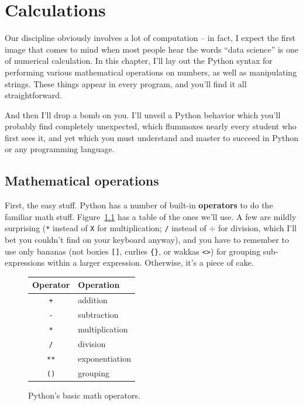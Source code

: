 

\chapter{Calculations}

Our discipline obviously involves a lot of computation -- in fact, I expect the
first image that comes to mind when most people hear the words ``data science''
is one of numerical calculation. In this chapter, I'll lay out the Python
syntax for performing various mathematical operations on numbers, as well as
manipulating strings. These things appear in every program, and you'll find it
all straightforward.

And then I'll drop a bomb on you. I'll unveil a Python behavior which you'll
probably find completely unexpected, which flummoxes nearly every student who
first sees it, and yet which you must understand and master to succeed in
Python or any programming language.

\section{Mathematical operations}


First, the easy stuff. Python has a number of built-in \textbf{operators} to do
the familiar math stuff. Figure~\ref{fig:mathOps} has a table of the ones we'll
use. A few are mildly surprising (\texttt{*} instead of \texttt{X} for
multiplication; \texttt{/} instead of $\div$ for division, which I'll bet you
couldn't find on your keyboard anyway), and you have to remember to use only
bananas (not boxies \texttt{[]}, curlies \texttt{\{\}}, or wakkas \texttt{<>})
for grouping sub-expressions within a larger expression. Otherwise, it's a
piece of cake.

\begin{figure}[ht]
\centering
\begin{tabular}{c | l}
\hline
Operator & Operation \\
\hline
\texttt{+} & addition \\
\texttt{-} & subtraction \\
\texttt{*} & multiplication \\
\texttt{/} & division \\
\texttt{**} & exponentiation \\
\texttt{()} & grouping \\
\hline
\end{tabular}
\smallskip
\caption{Python's basic math operators.}
\label{fig:mathOps}
\end{figure}

